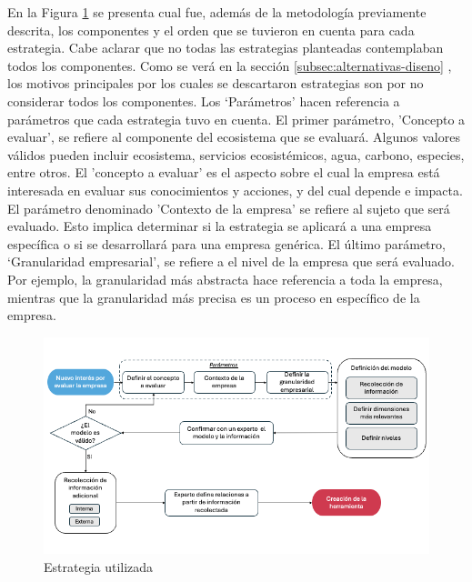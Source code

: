 En la Figura \ref{fig:estrategia} se presenta cual fue, además de la metodología previamente descrita, los componentes y el orden que se tuvieron en cuenta para cada estrategia. Cabe aclarar que no todas las estrategias planteadas contemplaban todos los componentes. Como se verá en la sección \ref{subsec:alternativas-diseno} , los motivos principales por los cuales se descartaron estrategias son por no considerar todos los componentes.  Los ‘Parámetros’ hacen referencia a parámetros que cada estrategia tuvo en cuenta. El primer parámetro, 'Concepto a evaluar', se refiere al componente del ecosistema que se evaluará. Algunos valores válidos pueden incluir ecosistema, servicios ecosistémicos, agua, carbono, especies, entre otros. El 'concepto a evaluar' es el aspecto sobre el cual la empresa está interesada en evaluar sus conocimientos y acciones, y del cual depende e impacta. El parámetro denominado 'Contexto de la empresa' se refiere al sujeto que será evaluado. Esto implica determinar si la estrategia se aplicará a una empresa específica o si se desarrollará para una empresa genérica. El último parámetro, ‘Granularidad empresarial’, se refiere a el nivel de la empresa que será evaluado. Por ejemplo, la granularidad más abstracta hace referencia a toda la empresa, mientras que la granularidad más precisa es un proceso en específico de la empresa. 

\begin{figure}[H]
    \centering
    \includegraphics[scale=0.35]{images/4-desarrollo/diagrama-estrategia.png}
    \caption{Estrategia utilizada}
    \label{fig:estrategia}
\end{figure}

